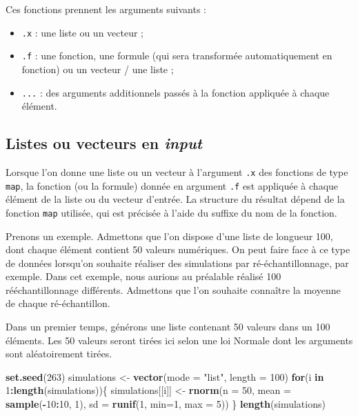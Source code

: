\documentclass[
  11pt,
]{book}
\newenvironment{Shaded}{\begin{snugshade}}{\end{snugshade}}
\newcommand{\ControlFlowTok}[1]{\textcolor[rgb]{0.13,0.29,0.53}{\textbf{#1}}}
\newcommand{\DataTypeTok}[1]{\textcolor[rgb]{0.13,0.29,0.53}{#1}}
\newcommand{\DecValTok}[1]{\textcolor[rgb]{0.00,0.00,0.81}{#1}}
\newcommand{\KeywordTok}[1]{\textcolor[rgb]{0.13,0.29,0.53}{\textbf{#1}}}
\newcommand{\NormalTok}[1]{#1}
\newcommand{\OperatorTok}[1]{\textcolor[rgb]{0.81,0.36,0.00}{\textbf{#1}}}
\newcommand{\StringTok}[1]{\textcolor[rgb]{0.31,0.60,0.02}{#1}}
\providecommand{\tightlist}{%
  \setlength{\itemsep}{0pt}\setlength{\parskip}{0pt}}
\numberwithin{equation}{section}
\numberwithin{countremarque}{section}
\begin{document}
Ces fonctions prennent les arguments suivants :

\begin{itemize}
\tightlist
\item
  \texttt{.x} : une liste ou un vecteur ;
\item
  \texttt{.f} : une fonction, une formule (qui sera transformée automatiquement en fonction) ou un vecteur / une liste ;
\item
  \texttt{...} : des arguments additionnels passés à la fonction appliquée à chaque élément.
\end{itemize}

\hypertarget{listes-ou-vecteurs-en-input}{%
\subsection{\texorpdfstring{Listes ou vecteurs en \emph{input}}{Listes ou vecteurs en input}}\label{listes-ou-vecteurs-en-input}}

Lorsque l'on donne une liste ou un vecteur à l'argument \texttt{.x} des fonctions de type \texttt{map}, la fonction (ou la formule) donnée en argument \texttt{.f} est appliquée à chaque élément de la liste ou du vecteur d'entrée. La structure du résultat dépend de la fonction \texttt{map} utilisée, qui est précisée à l'aide du suffixe du nom de la fonction.

Prenons un exemple. Admettons que l'on dispose d'une liste de longueur 100, dont chaque élément contient 50 valeurs numériques. On peut faire face à ce type de données lorsqu'on souhaite réaliser des simulations par ré-échantillonnage, par exemple. Dans cet exemple, nous aurions au préalable réalisé 100 rééchantillonnage différents. Admettons que l'on souhaite connaître la moyenne de chaque ré-échantillon.

Dans un premier temps, générons une liste contenant 50 valeurs dans un 100 éléments. Les 50 valeurs seront tirées ici selon une loi Normale dont les arguments sont aléatoirement tirées.

\begin{Shaded}
\begin{Highlighting}[]
\KeywordTok{set.seed}\NormalTok{(}\DecValTok{263}\NormalTok{)}
\NormalTok{simulations \textless{}{-}}\StringTok{ }\KeywordTok{vector}\NormalTok{(}\DataTypeTok{mode =} \StringTok{"list"}\NormalTok{, }\DataTypeTok{length =} \DecValTok{100}\NormalTok{)}
\ControlFlowTok{for}\NormalTok{(i }\ControlFlowTok{in} \DecValTok{1}\OperatorTok{:}\KeywordTok{length}\NormalTok{(simulations))\{}
\NormalTok{  simulations[[i]] \textless{}{-}}\StringTok{ }\KeywordTok{rnorm}\NormalTok{(}\DataTypeTok{n =} \DecValTok{50}\NormalTok{,}
                            \DataTypeTok{mean =} \KeywordTok{sample}\NormalTok{(}\OperatorTok{{-}}\DecValTok{10}\OperatorTok{:}\DecValTok{10}\NormalTok{, }\DecValTok{1}\NormalTok{),}
                            \DataTypeTok{sd =} \KeywordTok{runif}\NormalTok{(}\DecValTok{1}\NormalTok{, }\DataTypeTok{min=}\DecValTok{1}\NormalTok{, }\DataTypeTok{max =} \DecValTok{5}\NormalTok{))}
\NormalTok{\}}
\KeywordTok{length}\NormalTok{(simulations)}
\end{Highlighting}
\end{Shaded}
\end{document}
